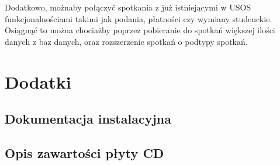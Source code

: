 \documentclass[licencjacka]{pracamgr}
\begin{document}
Dodatkowo, możnaby połączyć spotkania z już istniejącymi w USOS funkcjonalnościami takimi jak podania, płatności czy wymiany studenckie. Osiągnąć to można chociażby poprzez pobieranie do spotkań większej ilości danych z baz danych, oraz rozszerzenie spotkań o podtypy spotkań.

\chapter{Dodatki} \label{chap:dodatki}
\section{Dokumentacja instalacyjna}
\section{Opis zawartości płyty CD}
\end{document}
